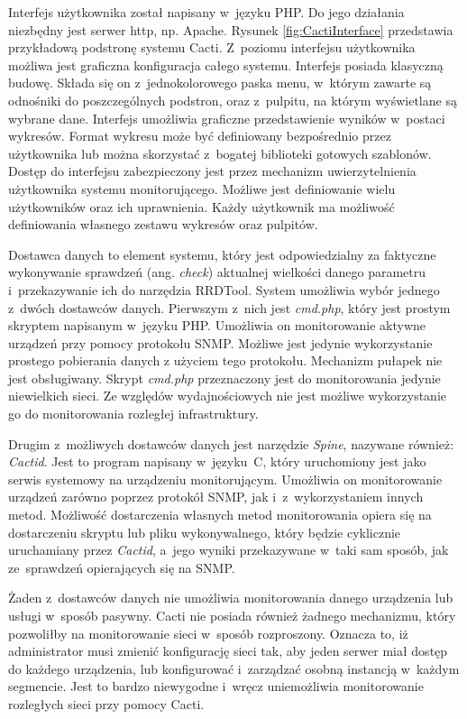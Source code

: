 Interfejs użytkownika został napisany w~języku PHP. Do jego działania
niezbędny jest serwer http, np. Apache. Rysunek
\ref{fig:CactiInterface} przedstawia przykładową podstronę systemu
Cacti. Z~poziomu interfejsu użytkownika możliwa jest graficzna
konfiguracja całego systemu. Interfejs posiada klasyczną
budowę. Składa się on z~jednokolorowego paska menu, w~którym zawarte
są odnośniki do poszczególnych podstron, oraz z~pulpitu, na którym
wyświetlane są wybrane dane. Interfejs umożliwia graficzne
przedstawienie wyników w~postaci wykresów. Format wykresu może być
definiowany bezpośrednio przez użytkownika lub można skorzystać
z~bogatej biblioteki gotowych szablonów. Dostęp do interfejsu
zabezpieczony jest przez mechanizm uwierzytelnienia użytkownika
systemu monitorującego. Możliwe jest definiowanie wielu użytkowników
oraz ich uprawnienia. Każdy użytkownik ma możliwość definiowania
własnego zestawu wykresów oraz pulpitów.

Dostawca danych to element systemu, który jest odpowiedzialny za
faktyczne wykonywanie sprawdzeń (ang. {\em check}) aktualnej wielkości
danego parametru i~przekazywanie ich do narzędzia RRDTool. System
umożliwia wybór jednego z~dwóch dostawców danych. Pierwszym z~nich
jest {\em cmd.php}, który jest prostym skryptem napisanym w~języku
PHP. Umożliwia on monitorowanie aktywne urządzeń przy pomocy protokołu
SNMP.  Możliwe jest jedynie wykorzystanie prostego pobierania danych z
użyciem tego protokołu. Mechanizm pułapek nie jest obsługiwany. Skrypt
{\em cmd.php} przeznaczony jest do monitorowania jedynie niewielkich
sieci. Ze względów wydajnościowych nie jest możliwe wykorzystanie go
do monitorowania rozległej infrastruktury.

Drugim z~możliwych dostawców danych jest narzędzie {\em Spine},
nazywane również: {\em Cactid}. Jest to program napisany w~języku~C,
który uruchomiony jest jako serwis systemowy na urządzeniu
monitorującym. Umożliwia on monitorowanie urządzeń zarówno poprzez
protokół SNMP, jak i~z~wykorzystaniem innych metod. Możliwość
dostarczenia własnych metod monitorowania opiera się na dostarczeniu
skryptu lub pliku wykonywalnego, który będzie cyklicznie uruchamiany
przez {\em Cactid}, a~jego wyniki przekazywane w~taki sam sposób, jak
ze~sprawdzeń opierających się na SNMP.

Żaden z~dostawców danych nie umożliwia monitorowania danego urządzenia
lub usługi w~sposób pasywny. Cacti nie posiada również żadnego
mechanizmu, który pozwoliłby na monitorowanie sieci w~sposób
rozproszony. Oznacza to, iż administrator musi zmienić konfigurację
sieci tak, aby jeden serwer miał dostęp do każdego urządzenia, lub
konfigurować i~zarządzać osobną instancją w~każdym segmencie. Jest to
bardzo niewygodne i~wręcz uniemożliwia monitorowanie rozległych sieci
przy pomocy Cacti.


